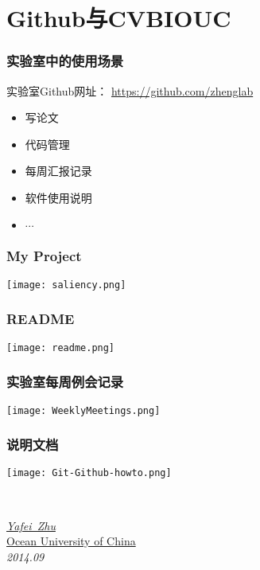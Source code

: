 \documentclass[notheorems,mathserif,table,compress]{beamer}  %
\newcommand\zhushadow[2][purple]{\hskip5pt\shadowbox{\color{#1}\small\kai #2\vspace{3mm}}}
\begin{document}
\section{Github与CVBIOUC}

\begin{frame}
  \frametitle{实验室中的使用场景}
  实验室Github网址： \url{https://github.com/zhenglab}

  \begin{itemize}
  \item 写论文
  \item 代码管理
  \item 每周汇报记录
  \item 软件使用说明
  \item $\cdots$
  \end{itemize}
\end{frame}


\begin{frame}
  \frametitle{My Project}
  \centering\texttt{[image: saliency.png]}
\end{frame}


\begin{frame}
  \frametitle{README}
  \centering\texttt{[image: readme.png]}
\end{frame}


\begin{frame}
  \frametitle{实验室每周例会记录}
  \centering\texttt{[image: WeeklyMeetings.png]}
\end{frame}


\begin{frame}
  \frametitle{说明文档}
  \centering\texttt{[image: Git-Github-howto.png]}
\end{frame}


\begin{frame}
  \vspace{2cm}
  \centering
  \zhushadow{\color{blue}\Huge{Thanks}}\\
  \vspace{1.5cm}
  \begin{flushright}
  \emph{\href{mailto:bingzh@ouc.edu.cn}{Yafei~Zhu}}\\
  \href{http://www.ouc.edu.cn}{Ocean University of China}\\
  \emph{2014.09}
  \end{flushright}  
\end{frame}
\end{document}
